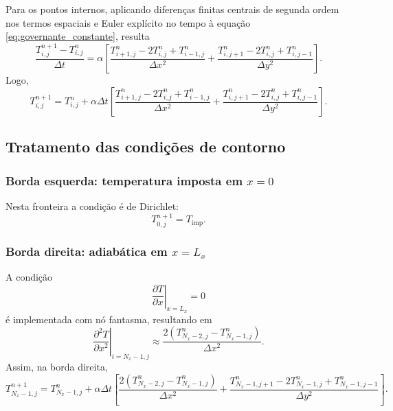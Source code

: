 \documentclass[12pt,a4paper]{article}
\begin{document}
Para os pontos internos, aplicando diferenças finitas centrais de segunda ordem nos termos espaciais e Euler explícito no tempo à equação \eqref{eq:governante_constante}, resulta
\begin{equation}
\frac{T_{i,j}^{n+1}-T_{i,j}^{n}}{\Delta t}=
\alpha\left[
\frac{T_{i+1,j}^{n}-2T_{i,j}^{n}+T_{i-1,j}^{n}}{\Delta x^2}
+
\frac{T_{i,j+1}^{n}-2T_{i,j}^{n}+T_{i,j-1}^{n}}{\Delta y^2}
\right].
\end{equation}
Logo,
\begin{equation}
T_{i,j}^{n+1}=T_{i,j}^{n}+
\alpha\Delta t\left[
\frac{T_{i+1,j}^{n}-2T_{i,j}^{n}+T_{i-1,j}^{n}}{\Delta x^2}
+
\frac{T_{i,j+1}^{n}-2T_{i,j}^{n}+T_{i,j-1}^{n}}{\Delta y^2}
\right].
\label{eq:interna}
\end{equation}

\subsection{Tratamento das condições de contorno}
\subsubsection*{Borda esquerda: temperatura imposta em $x=0$}
Nesta fronteira a condição é de Dirichlet:
\begin{equation}
T_{0,j}^{n+1}=T_{\text{imp}}.
\end{equation}

\subsubsection*{Borda direita: adiabática em $x=L_x$}
A condição
\begin{equation}
\left.\frac{\partial T}{\partial x}\right|_{x=L_x}=0
\end{equation}
é implementada com nó fantasma, resultando em
\begin{equation}
\left.\frac{\partial^2 T}{\partial x^2}\right|_{i=N_x-1,j}
\approx \frac{2\left(T_{N_x-2,j}^{n}-T_{N_x-1,j}^{n}\right)}{\Delta x^2}.
\end{equation}
Assim, na borda direita,
\begin{equation}
T_{N_x-1,j}^{n+1}=T_{N_x-1,j}^{n}+\alpha\Delta t\left[
\frac{2\left(T_{N_x-2,j}^{n}-T_{N_x-1,j}^{n}\right)}{\Delta x^2}
+
\frac{T_{N_x-1,j+1}^{n}-2T_{N_x-1,j}^{n}+T_{N_x-1,j-1}^{n}}{\Delta y^2}
\right].
\end{equation}
\end{document}
